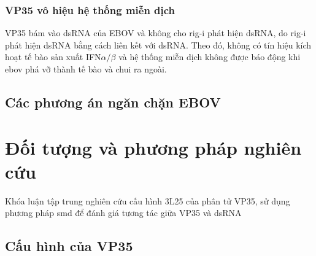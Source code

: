 \documentclass[12pt,a4paper,reqno, oneside]{book}
\begin{document}
\subsection{VP35 vô hiệu hệ thống miễn dịch}
\hspace{18pt}
		VP35 bám vào dsRNA của EBOV và không cho \gls{rig-i} phát hiện dsRNA, do \gls{rig-i} phát hiện dsRNA bằng cách liên kết với dsRNA. Theo đó, không có tín hiệu kích hoạt tế bào sản xuất IFN$\alpha / \beta$ và hệ thống miễn dịch không được báo động khi \gls{ebov} phá vỡ thành tế bào và chui ra ngoài\cite{Hartman2004}.
\section{Các phương án ngăn chặn EBOV}



\newpage
\pagestyle{fancy}
\setcounter{chapter}{1}
\chapter{Đối tượng và phương pháp nghiên cứu}
\hspace{18pt}
	Khóa luận tập trung nghiên cứu cấu hình 3L25 của phân tử VP35, sử dụng phương pháp \gls{smd} để đánh giá tương tác giữa VP35 và dsRNA
\section{Cấu hình của VP35}
\end{document}
